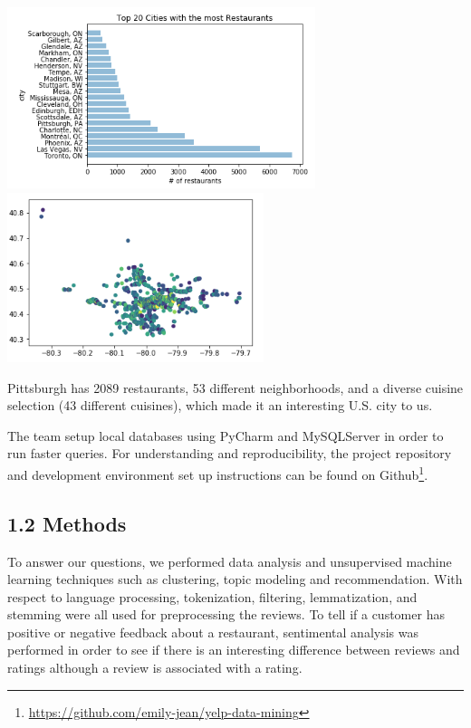 \documentclass{neu_handout}
\begin{document}
\begin{center}
\includegraphics[width=90mm,scale=0.5]{cities}
\includegraphics[width=75mm,scale=0.5]{pa_popular_restaurants}
\end{center}

Pittsburgh has 2089 restaurants, 53 different neighborhoods, and a diverse cuisine selection (43 different cuisines), which made it an interesting U.S. city to us.

The team setup local databases using PyCharm and MySQLServer in order to run faster queries. For understanding and reproducibility, the project repository and development environment set up instructions can be found on Github\footnote{\url{https://github.com/emily-jean/yelp-data-mining}}.


\subsection*{1.2 Methods}

To answer our questions, we performed data analysis and unsupervised machine learning techniques such as clustering, topic modeling and recommendation. With respect to language processing, tokenization, filtering, lemmatization, and stemming were all used for preprocessing the reviews. To tell if a customer has positive or negative feedback about a restaurant, sentimental analysis was performed in order to see if there is an interesting difference between reviews and ratings although a review is associated with a rating.
\end{document}

